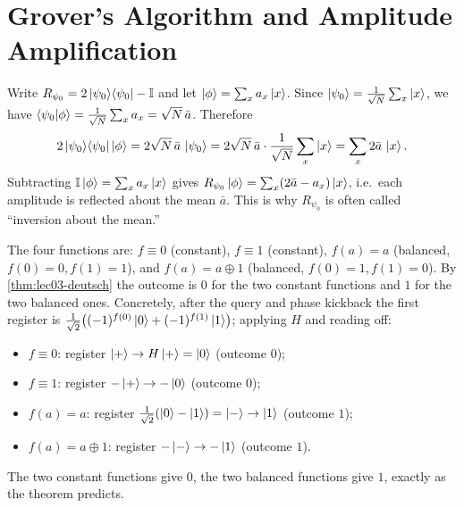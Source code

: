 \chapter{Grover's Algorithm and Amplitude Amplification}

\begin{solution}
Write $R_{\psi_0}=2\ket{\psi_0}\!\bra{\psi_0}-\mathbb{I}$ and let $\ket{\phi}=\sum_x a_x\ket{x}$. Since
$\ket{\psi_0}=\tfrac1{\sqrt N}\sum_x\ket{x}$, we have
$\braket{\psi_0|\phi}=\tfrac1{\sqrt N}\sum_x a_x=\sqrt N\,\bar a$. Therefore
\[
  2\ket{\psi_0}\!\bra{\psi_0}\ket{\phi}
    =2\sqrt N\,\bar a\,\ket{\psi_0}
    =2\sqrt N\,\bar a\cdot\frac1{\sqrt N}\sum_x\ket{x}
    =\sum_x 2\bar a\,\ket{x}.
\]
Subtracting $\mathbb{I}\ket{\phi}=\sum_x a_x\ket{x}$ gives
$R_{\psi_0}\ket{\phi}=\sum_x(2\bar a-a_x)\ket{x}$, i.e.\ each amplitude is reflected
about the mean $\bar a$. This is why $R_{\psi_0}$ is often called ``inversion about
the mean.''
\end{solution}

\begin{solution}
The four functions are: $f\equiv0$ (constant), $f\equiv1$ (constant), $f(a)=a$
(balanced, $f(0)=0,f(1)=1$), and $f(a)=a\oplus1$ (balanced, $f(0)=1,f(1)=0$). By
\cref{thm:lec03-deutsch} the outcome is $0$ for the two constant functions and $1$
for the two balanced ones. Concretely, after the query and phase kickback the first
register is $\tfrac1{\sqrt2}\bigl((-1)^{f(0)}\ket0+(-1)^{f(1)}\ket1\bigr)$; applying
$H$ and reading off:
\begin{itemize}[leftmargin=1.4em,nosep]
  \item $f\equiv0$: register $\ket{+}\to H\ket{+}=\ket0$ (outcome $0$);
  \item $f\equiv1$: register $-\ket{+}\to-\ket0$ (outcome $0$);
  \item $f(a)=a$: register $\tfrac1{\sqrt2}(\ket0-\ket1)=\ket{-}\to\ket1$ (outcome $1$);
  \item $f(a)=a\oplus1$: register $-\ket{-}\to-\ket1$ (outcome $1$).
\end{itemize}
The two constant functions give $0$, the two balanced functions give $1$, exactly
as the theorem predicts.
\end{solution}

